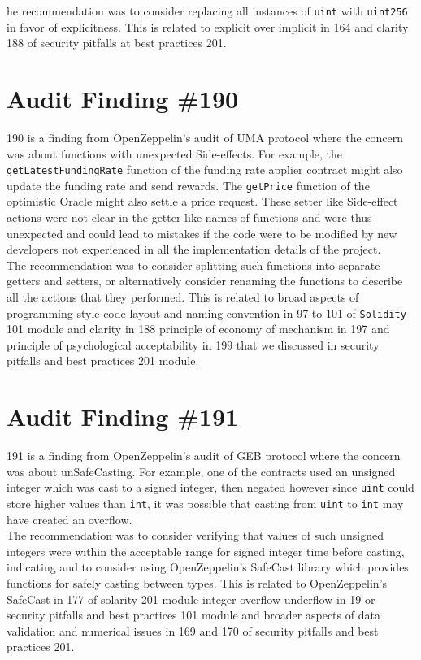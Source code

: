 he recommendation was to consider replacing all instances of \verb|uint| with \verb|uint256| in favor of explicitness. This is related to explicit over implicit in 164 and clarity 188 of security pitfalls at best practices 201.

\section{Audit Finding \#190}

190 is a finding from OpenZeppelin's audit of UMA protocol where the concern was about functions with unexpected Side-effects. For example, the \verb|getLatestFundingRate| function of the funding rate applier contract might also update the funding rate and send rewards. The \verb|getPrice| function of the optimistic Oracle might also settle a price request. These setter like Side-effect actions were not clear in the getter like names of functions and were thus unexpected and could lead to mistakes if the code were to be modified by new developers not experienced in all the implementation details of the project.\\

The recommendation was to consider splitting such functions into separate getters and setters, or alternatively consider renaming the functions to describe all the actions that they performed. This is related to broad aspects of programming style code layout and naming convention in 97 to 101 of \verb|Solidity| 101 module and clarity in 188 principle of economy of mechanism in 197 and principle of psychological acceptability in 199 that we discussed in security pitfalls and best practices 201 module.

\section{Audit Finding \#191}

191 is a finding from OpenZeppelin's audit of GEB protocol where the concern was about unSafeCasting. For example, one of the contracts used an unsigned integer which was cast to a signed integer, then negated however since \verb|uint| could store higher values than \verb|int|, it was possible that casting from \verb|uint| to \verb|int| may have created an overflow.\\

The recommendation was to consider verifying that values of such unsigned integers were within the acceptable range for signed integer time before casting, indicating and to consider using OpenZeppelin's SafeCast library which provides functions for safely casting between types. This is related to OpenZeppelin's SafeCast in 177 of solarity 201 module integer overflow underflow in 19 or security pitfalls and best practices 101 module and broader aspects of data validation and numerical issues in 169 and 170 of security pitfalls and best practices 201.

